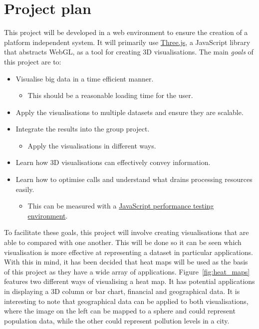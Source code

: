 \documentclass[a4paper]{article}
\begin{document}
	\section{Project plan} {
	\label{sec:project_plan}
		
		This project will be developed in a web environment to ensure the creation of a platform independent system. It will primarily use \href{http://threejs.org/}{Three.js}, a JavaScript library that abstracts WebGL, as a tool for creating 3D visualisations. The main \emph{goals} of this project are to:
		
		\begin{itemize}
			\item Visualise big data in a time efficient manner. 
			\begin{itemize}
				\item This should be a reasonable loading time for the user.
			\end{itemize}
			\item Apply the visualisations to multiple datasets and ensure they are scalable. 
			\item Integrate the results into the group project.
			\begin{itemize}
				\item Apply the visualisations in different ways.
			\end{itemize}
			\item Learn how 3D visualisations can effectively convey information.
			\item Learn how to optimise calls and understand what drains processing resources easily.
			\begin{itemize}
				\item This can be measured with a \href{http://jsperf.com/}{JavaScript performance testing environment}.
			\end{itemize}
		\end{itemize}
		
		To facilitate these goals, this project will involve creating visualisations that are able to compared with one another. This will be done so it can be seen which visualisation is more effective at representing a dataset in particular applications. With this in mind, it has been decided that heat maps will be used as the basis of this project as they have a wide array of applications. Figure~\ref{fig:heat_maps} features two different ways of visualising a heat map. It has potential applications in displaying a 3D column or bar chart, financial and geographical data. It is interesting to note that geographical data can be applied to both visualisations, where the image on the left can be mapped to a sphere and could represent population data, while the other could represent pollution levels in a city.
		
}
\end{document}
